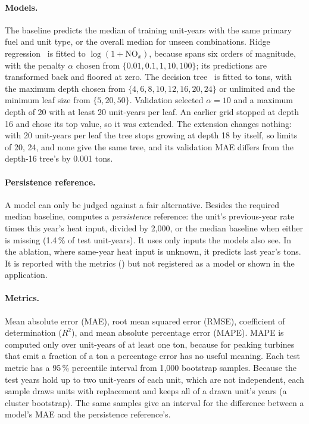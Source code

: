 \documentclass[11pt,a4paper]{article}
\begin{document}
\paragraph{Models.} The baseline predicts the median \NOx{} of training unit-years with the same
primary fuel and unit type, or the overall median for unseen combinations. Ridge
regression~\cite{hoerl1970ridge} is fitted to $\log(1 + \text{NO}_x)$, because \NOx{} spans six
orders of magnitude, with the penalty $\alpha$ chosen from $\{0.01, 0.1, 1, 10, 100\}$; its
predictions are transformed back and floored at zero. The decision tree~\cite{breiman1984cart}
is fitted to tons, with the maximum depth chosen from $\{4, 6, 8, 10, 12, 16, 20, 24\}$ or
unlimited and the minimum leaf size from $\{5, 20, 50\}$. Validation selected $\alpha = 10$ and a
maximum depth of 20 with at least 20 unit-years per leaf. An earlier grid stopped at depth 16 and
chose its top value, so it was extended. The extension changes nothing: with 20 unit-years per
leaf the tree stops growing at depth 18 by itself, so limits of 20, 24, and none give the same
tree, and its validation MAE differs from the depth-16 tree's by 0.001 tons.

\paragraph{Persistence reference.} A model can only be judged against a fair alternative. Besides
the required median baseline,  computes a \emph{persistence} reference: the unit's
previous-year \NOx{} rate times this year's heat input, divided by 2{,}000, or the median
baseline when either is missing (1.4\,\% of test unit-years). It uses only inputs the models
also see. In the ablation, where same-year heat input is unknown, it predicts last year's tons.
It is reported with the metrics () but not registered as a model
or shown in the application.

\paragraph{Metrics.} Mean absolute error (MAE), root mean squared error (RMSE), coefficient of
determination ($R^2$), and mean absolute percentage error (MAPE). MAPE is computed only over
unit-years of at least one ton, because for peaking turbines that emit a fraction of a ton a
percentage error has no useful meaning. Each test metric has a 95\,\% percentile interval from
1{,}000 bootstrap samples. Because the test years hold up to two unit-years of each unit, which
are not independent, each sample draws units with replacement and keeps all of a drawn unit's
years (a cluster bootstrap). The same samples give an interval for the difference between a
model's MAE and the persistence reference's.
\end{document}
